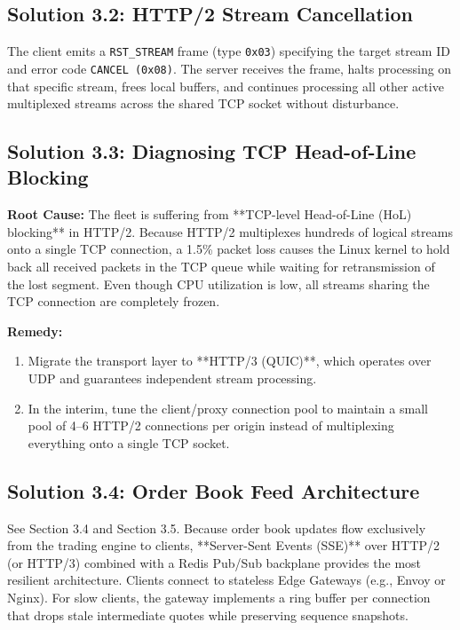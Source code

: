\subsection{Solution 3.2: HTTP/2 Stream Cancellation}
The client emits a \texttt{RST\_STREAM} frame (type \texttt{0x03}) specifying the target stream ID and error code \texttt{CANCEL (0x08)}. The server receives the frame, halts processing on that specific stream, frees local buffers, and continues processing all other active multiplexed streams across the shared TCP socket without disturbance.

\subsection{Solution 3.3: Diagnosing TCP Head-of-Line Blocking}
\textbf{Root Cause:} The fleet is suffering from **TCP-level Head-of-Line (HoL) blocking** in HTTP/2. Because HTTP/2 multiplexes hundreds of logical streams onto a single TCP connection, a 1.5\% packet loss causes the Linux kernel to hold back all received packets in the TCP queue while waiting for retransmission of the lost segment. Even though CPU utilization is low, all streams sharing the TCP connection are completely frozen.

\textbf{Remedy:}
\begin{enumerate}
  \item Migrate the transport layer to **HTTP/3 (QUIC)**, which operates over UDP and guarantees independent stream processing.
  \item In the interim, tune the client/proxy connection pool to maintain a small pool of 4--6 HTTP/2 connections per origin instead of multiplexing everything onto a single TCP socket.
\end{enumerate}

\subsection{Solution 3.4: Order Book Feed Architecture}
See Section 3.4 and Section 3.5. Because order book updates flow exclusively from the trading engine to clients, **Server-Sent Events (SSE)** over HTTP/2 (or HTTP/3) combined with a Redis Pub/Sub backplane provides the most resilient architecture. Clients connect to stateless Edge Gateways (e.g., Envoy or Nginx). For slow clients, the gateway implements a ring buffer per connection that drops stale intermediate quotes while preserving sequence snapshots.

